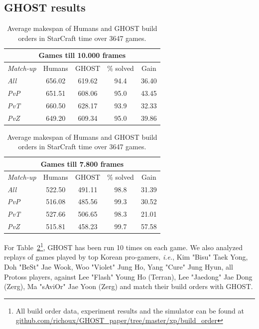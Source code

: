 \documentclass[journal]{IEEEtran}
\newcommand{\ghost}{\textsc{GHOST}\xspace}
\newcommand{\ie}{\textit{i.e.}}
\begin{document}
\subsection{\ghost results}
\begin{table}[ht]
  \caption{Average  makespan  of Humans  and  \ghost  build orders  in
    StarCraft time over 3647 games.}
  \label{tab:bo}
  \centering
  \begin{tabular}{|l|c|c|c|c|} 
    \hline
    \multicolumn{5}{|c|}{Games till 10.000 frames} \\ 
    \hline
    {\em Match-up} & Humans & \ghost & \% solved &
    Gain \\ 
    \hline
    {\em All} & 656.02 & 619.62 & 94.4 & 36.40\\
    {\em PvP} & 651.51 & 608.06 & 95.0 & 43.45\\
    {\em PvT} & 660.50 & 628.17 & 93.9 & 32.33\\
    {\em PvZ} & 649.20 & 609.34 & 95.0 & 39.86\\
    \hline
  \end{tabular}
  \begin{tabular}{|l|c|c|c|c|} 
    \hline
    \multicolumn{5}{|c|}{Games till 7.800 frames} \\ 
    \hline
    {\em Match-up} & Humans & \ghost & \% solved &
    Gain \\ 
    \hline
    {\em All} & 522.50 & 491.11 & 98.8 & 31.39\\
    {\em PvP} & 516.08 & 485.56 & 99.3 & 30.52\\
    {\em PvT} & 527.66 & 506.65 & 98.3 & 21.01\\
    {\em PvZ} & 515.81 & 458.23 & 99.7 & 57.58\\ 
    \hline
  \end{tabular}  
\end{table}
For  Table~\ref{tab:bo}\footnote{All  build   order  data,  experiment
  results     and     the     simulator    can     be     found     at
  \href{https://github.com/richoux/GHOST\_paper/tree/master/xp/build\_order}{github.com/richoux/GHOST\_paper/tree/master/xp/build\_order}},
\ghost has been run 10 times on each game. We also analyzed replays of
games played by top Korean pro-gamers,  \ie, Kim "Bisu" Taek Yong, Doh
"BeSt" Jae  Wook, Woo  "Violet" Jung  Ho, Yang  "Cure" Jung  Hyun, all
Protoss players, against Lee "Flash"  Young Ho (Terran), Lee "Jaedong"
Jae Dong  (Zerg), Ma "sAviOr"  Jae Yoon  (Zerg) and match  their build
orders with \ghost {}.
\end{document}
